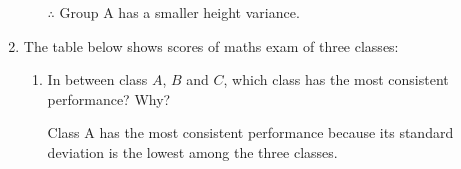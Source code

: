 \documentclass{report}
\begin{document}
\begin{multicols}{2}
\begin{enumerate}
\begin{enumerate}
                  $\therefore$ Group A has a smaller height variance.
          \end{enumerate}

    \item The table below shows scores of maths exam of three classes:
          \begin{center}
          \end{center}
          \begin{enumerate}
            \item In between class $A$, $B$ and $C$, which class has the most consistent
                  performance? Why? \sol{}

                  Class A has the most consistent performance because its standard deviation is
                  the lowest among the three classes.


\end{enumerate}
\end{enumerate}
\end{multicols}
\end{document}
